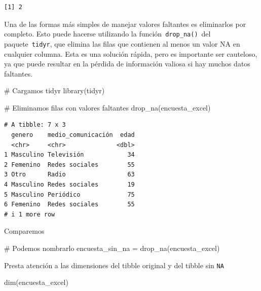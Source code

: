 \documentclass[
  letterpaper,
  DIV=11,
  numbers=noendperiod,
  twoside]{scrreprt}
\newenvironment{Shaded}{\begin{snugshade}}{\end{snugshade}}
\newcommand{\CommentTok}[1]{\textcolor[rgb]{0.37,0.37,0.37}{#1}}
\newcommand{\FunctionTok}[1]{\textcolor[rgb]{0.28,0.35,0.67}{#1}}
\newcommand{\NormalTok}[1]{\textcolor[rgb]{0.00,0.23,0.31}{#1}}
\newcommand{\OtherTok}[1]{\textcolor[rgb]{0.00,0.23,0.31}{#1}}
\begin{document}
\begin{verbatim}
[1] 2
\end{verbatim}

Una de las formas más simples de manejar valores faltantes es
eliminarlos por completo. Esto puede hacerse utilizando la
función~\texttt{drop\_na()}~del paquete~\texttt{tidyr}, que elimina las
filas que contienen al menos un valor NA en cualquier columna. Esta es
una solución rápida, pero es importante ser cauteloso, ya que puede
resultar en la pérdida de información valiosa si hay muchos datos
faltantes.

\begin{Shaded}
\begin{Highlighting}[]
\CommentTok{\# Cargamos tidyr}
\FunctionTok{library}\NormalTok{(tidyr)}
\end{Highlighting}
\end{Shaded}

\begin{Shaded}
\begin{Highlighting}[]
\CommentTok{\# Eliminamos filas con valores faltantes}
\FunctionTok{drop\_na}\NormalTok{(encuesta\_excel)}
\end{Highlighting}
\end{Shaded}

\begin{verbatim}
# A tibble: 7 x 3
  genero    medio_comunicación  edad
  <chr>     <chr>              <dbl>
1 Masculino Televisión            34
2 Femenino  Redes sociales        55
3 Otro      Radio                 63
4 Masculino Redes sociales        19
5 Masculino Periódico             75
6 Femenino  Redes sociales        55
# i 1 more row
\end{verbatim}

Comparemos

\begin{Shaded}
\begin{Highlighting}[]
\CommentTok{\# Podemos nombrarlo}
\NormalTok{encuesta\_sin\_na }\OtherTok{=} \FunctionTok{drop\_na}\NormalTok{(encuesta\_excel)}
\end{Highlighting}
\end{Shaded}

Presta atención a las dimensiones del tibble original y del tibble sin
\texttt{NA}

\begin{Shaded}
\begin{Highlighting}[]
\FunctionTok{dim}\NormalTok{(encuesta\_excel)}
\end{Highlighting}
\end{Shaded}
\end{document}
